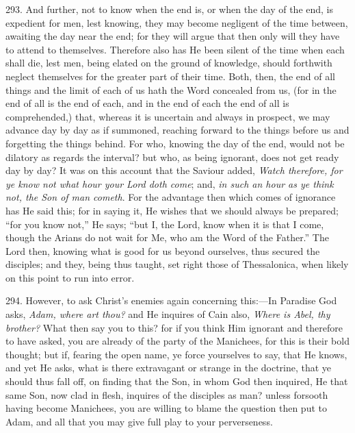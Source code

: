 293.
And further, not to know when the end is, or when the day of the end,
is expedient for men, lest knowing, they may become negligent of the
time between, awaiting the day near the end; for they will argue that
then only will they have to attend to themselves. Therefore also has
He been silent of the time when each shall die, lest men, being elated
on the ground of knowledge, should forthwith neglect themselves for
the greater part of their time. Both, then, the end of all things and
the limit of each of us hath the Word concealed from us, (for in
the end of all is the end of each, and in the end of each the end of
all is comprehended,) that, whereas it is uncertain and always in
prospect, we may advance day by day as if summoned, reaching forward
to the things before us and forgetting the things behind. For who,
knowing the day of the end, would not be dilatory as regards the
interval? but who, as being ignorant, does not get ready day by day?
It was on this account that the Saviour added, \emph{Watch therefore, for
ye know not what hour your Lord doth come}; and, \emph{in such an hour
as ye think not, the Son of man cometh}. For the advantage then
which comes of ignorance has He said this; for in saying it, He wishes
that we should always be prepared; ``for you know not,'' He says; ``but
I, the Lord, know when it is that I come, though the Arians do not
wait for Me, who am the Word of the Father.'' The Lord then, knowing
what is good for us beyond ourselves, thus secured the disciples; and
they, being thus taught, set right those of Thessalonica, when likely
on this point to run into error.

294.
However, to ask Christ's enemies again concerning this:—In Paradise
God asks, \emph{Adam, where art thou?} and He inquires of Cain also, \emph{Where
is Abel, thy brother?} What then say you to this? for if you think
Him ignorant and therefore to have asked, you are already of the party
of the Manichees, for this is their bold thought; but if, fearing the
open name, ye force yourselves to say, that He knows, and yet He asks,
what is there extravagant or strange in the doctrine, that ye should
thus fall off, on finding that the Son, in whom God then inquired, He
that same Son, now clad in flesh, inquires of the disciples as man?
unless forsooth having become Manichees, you are willing to blame the
question then put to Adam, and all that you may give full play to your
perverseness.

